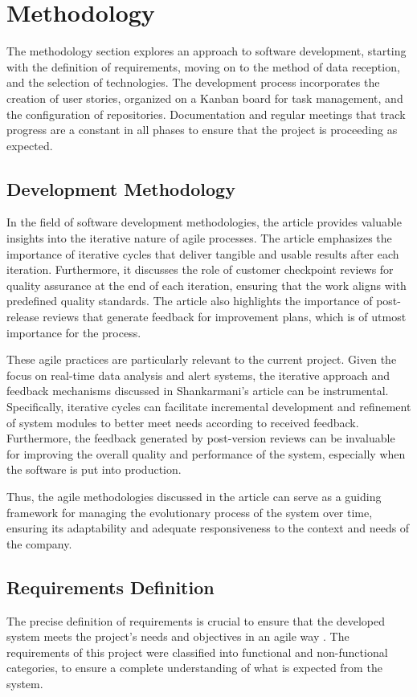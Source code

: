 \chapter{Methodology}\label{cap:metodology}
The methodology section explores an approach to software development, starting with the definition of requirements, moving on to the method of data reception, and the selection of technologies. The development process incorporates the creation of user stories, organized on a Kanban board for task management, and the configuration of repositories. Documentation and regular meetings that track progress are a constant in all phases to ensure that the project is proceeding as expected.

\section{Development Methodology}
In the field of software development methodologies, the article \cite{shankarmani2012agile} provides valuable insights into the iterative nature of agile processes. The article emphasizes the importance of iterative cycles that deliver tangible and usable results after each iteration. Furthermore, it discusses the role of customer checkpoint reviews for quality assurance at the end of each iteration, ensuring that the work aligns with predefined quality standards. The article also highlights the importance of post-release reviews that generate feedback for improvement plans, which is of utmost importance for the process.

These agile practices are particularly relevant to the current project. Given the focus on real-time data analysis and alert systems, the iterative approach and feedback mechanisms discussed in Shankarmani's article can be instrumental. Specifically, iterative cycles can facilitate incremental development and refinement of system modules to better meet needs according to received feedback. Furthermore, the feedback generated by post-version reviews can be invaluable for improving the overall quality and performance of the system, especially when the software is put into production.

Thus, the agile methodologies discussed in the article can serve as a guiding framework for managing the evolutionary process of the system over time, ensuring its adaptability and adequate responsiveness to the context and needs of the company.

\section[Requirements Definition]{Requirements Definition}\label{sec:req}The precise definition of requirements is crucial to ensure that the developed system meets the project's needs and objectives in an agile way \cite{asghar2016role}. The requirements of this project were classified into functional and non-functional categories, to ensure a complete understanding of what is expected from the system.

